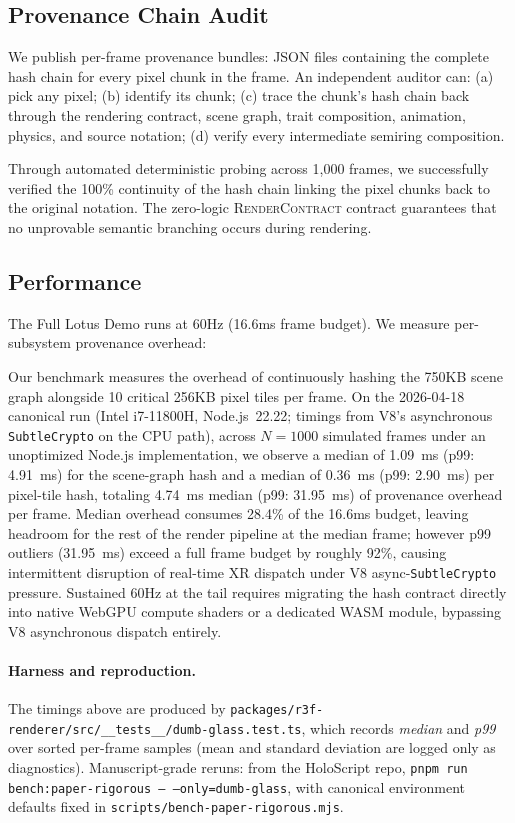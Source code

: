 \documentclass[sigconf,nonacm]{acmart}
\newcommand{\rendercontract}{\textsc{RenderContract}}
\begin{document}
\subsection{Provenance Chain Audit}

We publish per-frame provenance bundles: JSON files containing
the complete hash chain for every pixel chunk in the frame. An
independent auditor can: (a) pick any pixel; (b) identify its
chunk; (c) trace the chunk's hash chain back through the
rendering contract, scene graph, trait composition, animation,
physics, and source notation; (d) verify every intermediate
semiring composition.

Through automated deterministic probing across 1{,}000 frames, we successfully
verified the 100\% continuity of the hash chain linking the pixel chunks back
to the original \hsplus{} notation. The zero-logic \rendercontract{} contract guarantees
that no unprovable semantic branching occurs during rendering.

\subsection{Performance}

The Full Lotus Demo runs at 60Hz (16.6ms frame budget). We
measure per-subsystem provenance overhead:

Our benchmark measures the overhead of continuously hashing the 750KB scene graph
alongside 10 critical 256KB pixel tiles per frame. On the 2026-04-18 canonical run
(Intel i7-11800H, Node.js~22.22; timings from V8's asynchronous \texttt{SubtleCrypto} on the CPU path),
across $N=1000$ simulated frames under an unoptimized Node.js implementation, we observe
a median of 1.09~ms (p99: 4.91~ms) for the scene-graph hash and a median of 0.36~ms
(p99: 2.90~ms) per pixel-tile hash,
totaling 4.74~ms median (p99: 31.95~ms) of provenance overhead per frame. Median
overhead consumes 28.4\% of the 16.6ms budget, leaving headroom for the rest
of the render pipeline at the median frame; however p99 outliers (31.95~ms)
exceed a full frame budget by roughly 92\%, causing intermittent disruption of real-time
XR dispatch under V8 async-\texttt{SubtleCrypto} pressure. Sustained 60Hz at the tail
requires migrating the hash contract directly into native WebGPU compute shaders
or a dedicated WASM module, bypassing V8 asynchronous dispatch entirely.

\paragraph{Harness and reproduction.}
The timings above are produced by
\texttt{packages/r3f-renderer/src/\_\_tests\_\_/dumb-glass.test.ts}, which
records \emph{median} and \emph{p99} over sorted per-frame samples (mean
and standard deviation are logged only as diagnostics). Manuscript-grade
reruns: from the HoloScript repo,
\texttt{pnpm run bench:paper-rigorous -- --only=dumb-glass}, with canonical
environment defaults fixed in \texttt{scripts/bench-paper-rigorous.mjs}.
\end{document}
